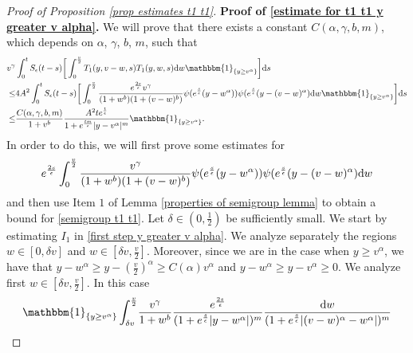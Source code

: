\documentclass[11pt]{article}
\numberwithin{equation}{section}
\newcommand{\der}{\textup{d}}
\begin{document}
\begin{proof}[Proof of Proposition 
\ref{prop estimates t1 t1}]
\textbf{Proof of \eqref{estimate for t1 t1 y greater v alpha}.} We will prove that there exists a constant $C(\alpha,\gamma,b,m)$, which depends on $\alpha$, $\gamma$, $b$, $m$, such that
\begin{align*}
 v^{\gamma}&\int_{0}^{t}S_{\epsilon}(t-s)\bigg[\int_{0}^{\frac{v}{2}} T_{1}(y,v-w,s)T_{1}(y,w,s)\der w\mathbbm{1}_{\{y\geq v^{\alpha}\}}\bigg]\der s\\
 \leq &
4A^{2}\int_{0}^{t}S_{\epsilon}(t-s)\bigg[\int_{0}^{\frac{v}{2}}\frac{e^{\frac{2s}{\epsilon}}v^{\gamma}}{(1+w^{b})(1+(v-w)^{b})} \psi(e^{\frac{s}{\epsilon}}(y-w^{\alpha}))\psi(e^{\frac{s}{\epsilon}}(y-(v-w)^{\alpha})\der w \mathbbm{1}_{\{y\geq v^{\alpha}\}}\bigg]\der s\\
\leq & \frac{C(\alpha,\gamma,b,m) }{1+v^{b}}\frac{ A^{2}t e^{\frac{t}{\epsilon}}}{1+e^{\frac{tm}{\epsilon}}|y-v^{\alpha}|^{m}} \mathbbm{1}_{\{y\geq v^{\alpha}\}}.
\end{align*}
In order to do this, we will first prove some estimates for
\begin{align}\label{estimate t1 t1}
e^{\frac{2s}{\epsilon}}\int_{0}^{\frac{v}{2}}\frac{v^{\gamma}}{(1+w^{b})(1+(v-w)^{b})}\psi(e^{\frac{s}{\epsilon}}(y-w^{\alpha}))\psi(e^{\frac{s}{\epsilon}}(y-(v-w)^{\alpha})\der w
\end{align}
and then use Item $1$ of Lemma 
\ref{properties of semigroup lemma} to obtain a bound for \eqref{semigroup t1 t1}.  Let $\delta\in(0,\frac{1}{2})$ be sufficiently small. We start by estimating $I_{1}$ in \eqref{first step y greater v alpha}. We analyze separately the regions $w\in[0,\delta v]$ and $w\in[\delta v, \frac{v}{2}]$.  Moreover, since we are in the case when $y\geq v^{\alpha}$, we have that $y-w^{\alpha}\geq y-(\frac{v}{2})^{\alpha}\geq C(\alpha)v^{\alpha}$ and $y-w^{\alpha}\geq y-v^{\alpha}\geq 0$. We analyze first $w\in[\delta v, \frac{v}{2}]$. In this case
\begin{align}
   \mathbbm{1}_{\{y\geq v^{\alpha}\}} \int_{\delta v}^{\frac{v}{2}} & \frac{v^{\gamma}}{1+w^{b}}\frac{e^{\frac{2s}{\epsilon}}}{(1+e^{\frac{s}{\epsilon}}|y-w^{\alpha}|)^{m}}\frac{\der w}{(1+e^{\frac{s}{\epsilon}}|(v-w)^{\alpha}-w^{\alpha}|)^{m}}\nonumber\\

\end{align}
\end{proof}
\end{document}
